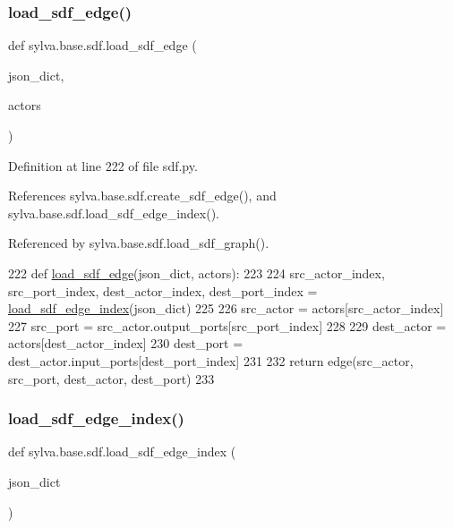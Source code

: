 \subsubsection{\texorpdfstring{load\+\_\+sdf\+\_\+edge()}{load\_sdf\_edge()}}
{\footnotesize\ttfamily def sylva.\+base.\+sdf.\+load\+\_\+sdf\+\_\+edge (\begin{DoxyParamCaption}\item[{}]{json\+\_\+dict,  }\item[{}]{actors }\end{DoxyParamCaption})}



Definition at line 222 of file sdf.\+py.



References sylva.\+base.\+sdf.\+create\+\_\+sdf\+\_\+edge(), and sylva.\+base.\+sdf.\+load\+\_\+sdf\+\_\+edge\+\_\+index().



Referenced by sylva.\+base.\+sdf.\+load\+\_\+sdf\+\_\+graph().


\begin{DoxyCode}
222     \textcolor{keyword}{def }\hyperlink{namespacesylva_1_1base_1_1sdf_acd1ba464e47476a5205de3e3856fbb83}{load\_sdf\_edge}(json\_dict, actors):
223 
224         src\_actor\_index, src\_port\_index, dest\_actor\_index, dest\_port\_index = 
      \hyperlink{namespacesylva_1_1base_1_1sdf_a67886f481ab9be68797400241d754f64}{load\_sdf\_edge\_index}(json\_dict)
225 
226         src\_actor = actors[src\_actor\_index]
227         src\_port = src\_actor.output\_ports[src\_port\_index]
228 
229         dest\_actor = actors[dest\_actor\_index]
230         dest\_port = dest\_actor.input\_ports[dest\_port\_index]
231 
232         \textcolor{keywordflow}{return} edge(src\_actor, src\_port, dest\_actor, dest\_port)
233 
\end{DoxyCode}
\mbox{\label{namespacesylva_1_1base_1_1sdf_a67886f481ab9be68797400241d754f64}} 
\subsubsection{\texorpdfstring{load\+\_\+sdf\+\_\+edge\+\_\+index()}{load\_sdf\_edge\_index()}}
{\footnotesize\ttfamily def sylva.\+base.\+sdf.\+load\+\_\+sdf\+\_\+edge\+\_\+index (\begin{DoxyParamCaption}\item[{}]{json\+\_\+dict }\end{DoxyParamCaption})}



